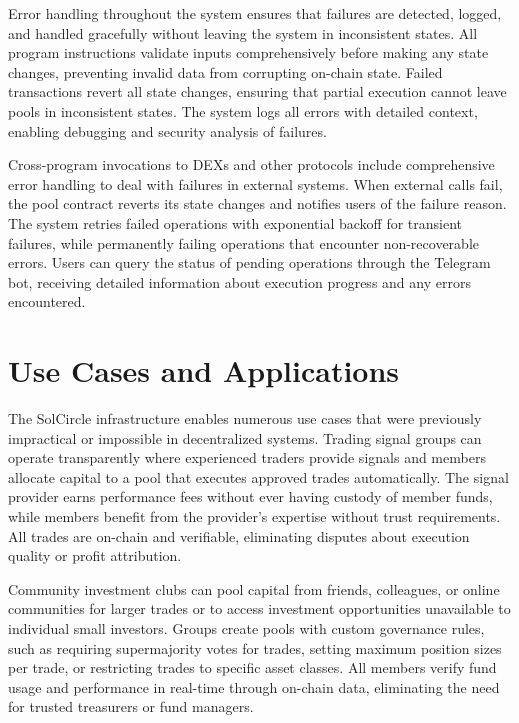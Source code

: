 \documentclass[11pt,a4paper]{article}
\begin{document}
Error handling throughout the system ensures that failures are detected, logged, and handled gracefully without leaving the system in inconsistent states. All program instructions validate inputs comprehensively before making any state changes, preventing invalid data from corrupting on-chain state. Failed transactions revert all state changes, ensuring that partial execution cannot leave pools in inconsistent states. The system logs all errors with detailed context, enabling debugging and security analysis of failures.

Cross-program invocations to DEXs and other protocols include comprehensive error handling to deal with failures in external systems. When external calls fail, the pool contract reverts its state changes and notifies users of the failure reason. The system retries failed operations with exponential backoff for transient failures, while permanently failing operations that encounter non-recoverable errors. Users can query the status of pending operations through the Telegram bot, receiving detailed information about execution progress and any errors encountered.

\section{Use Cases and Applications}

The SolCircle infrastructure enables numerous use cases that were previously impractical or impossible in decentralized systems. Trading signal groups can operate transparently where experienced traders provide signals and members allocate capital to a pool that executes approved trades automatically. The signal provider earns performance fees without ever having custody of member funds, while members benefit from the provider's expertise without trust requirements. All trades are on-chain and verifiable, eliminating disputes about execution quality or profit attribution.

Community investment clubs can pool capital from friends, colleagues, or online communities for larger trades or to access investment opportunities unavailable to individual small investors. Groups create pools with custom governance rules, such as requiring supermajority votes for trades, setting maximum position sizes per trade, or restricting trades to specific asset classes. All members verify fund usage and performance in real-time through on-chain data, eliminating the need for trusted treasurers or fund managers.
\end{document}
